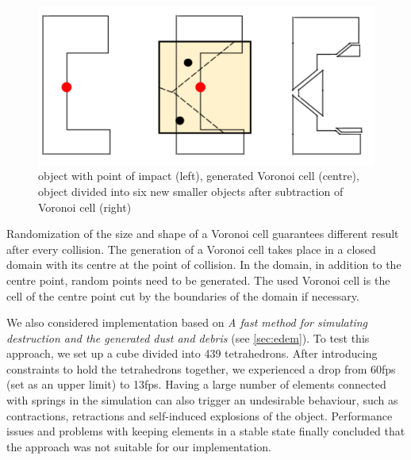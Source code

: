 \begin{figure}
        \centering
        \includegraphics[width=\textwidth]{img/subtractionProcess}
        \caption{object with point of impact (left), generated Voronoi cell (centre), object divided into six new smaller objects after subtraction of Voronoi cell (right)}
        \label{fig:subtraction}
\end{figure}

Randomization of the size and shape of a Voronoi cell guarantees different result after every collision. The generation of a Voronoi cell takes place in a closed domain with its centre at the point of collision. In the domain, in addition to the centre point, random points need to be generated. The used Voronoi cell is the cell of the centre point cut by the boundaries of the domain if necessary.

We also considered implementation based on \emph{A fast method for simulating destruction and the generated dust and debris} (see \cref{sec:edem}). To test this approach, we set up a cube divided into 439 tetrahedrons. After introducing constraints to hold the tetrahedrons together, we experienced a drop from 60fps (set as an upper limit) to 13fps. Having a large number of elements connected with springs in the simulation can also trigger an undesirable behaviour, such as contractions, retractions and self-induced explosions of the object. Performance issues and problems with keeping elements in a stable state finally concluded that the approach was not suitable for our implementation.



